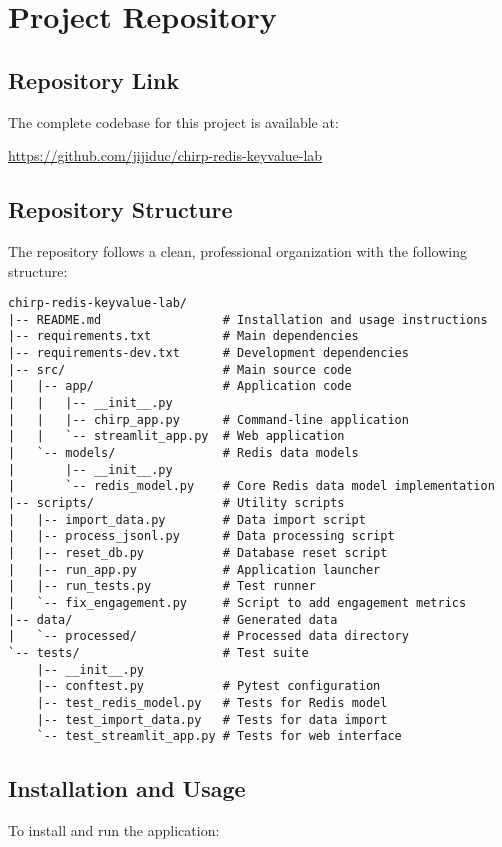 \documentclass[a4paper,11pt]{article}
\begin{document}
\section{Project Repository}

\subsection{Repository Link}
The complete codebase for this project is available at:
\begin{center}
\url{https://github.com/jijiduc/chirp-redis-keyvalue-lab}
\end{center}

\subsection{Repository Structure}
The repository follows a clean, professional organization with the following structure:
\begin{verbatim}
chirp-redis-keyvalue-lab/
|-- README.md                 # Installation and usage instructions
|-- requirements.txt          # Main dependencies
|-- requirements-dev.txt      # Development dependencies
|-- src/                      # Main source code 
|   |-- app/                  # Application code
|   |   |-- __init__.py
|   |   |-- chirp_app.py      # Command-line application
|   |   `-- streamlit_app.py  # Web application
|   `-- models/               # Redis data models
|       |-- __init__.py      
|       `-- redis_model.py    # Core Redis data model implementation
|-- scripts/                  # Utility scripts
|   |-- import_data.py        # Data import script
|   |-- process_jsonl.py      # Data processing script
|   |-- reset_db.py           # Database reset script
|   |-- run_app.py            # Application launcher
|   |-- run_tests.py          # Test runner
|   `-- fix_engagement.py     # Script to add engagement metrics
|-- data/                     # Generated data
|   `-- processed/            # Processed data directory
`-- tests/                    # Test suite
    |-- __init__.py
    |-- conftest.py           # Pytest configuration
    |-- test_redis_model.py   # Tests for Redis model
    |-- test_import_data.py   # Tests for data import
    `-- test_streamlit_app.py # Tests for web interface
\end{verbatim}

\subsection{Installation and Usage}
To install and run the application:
\end{document}
